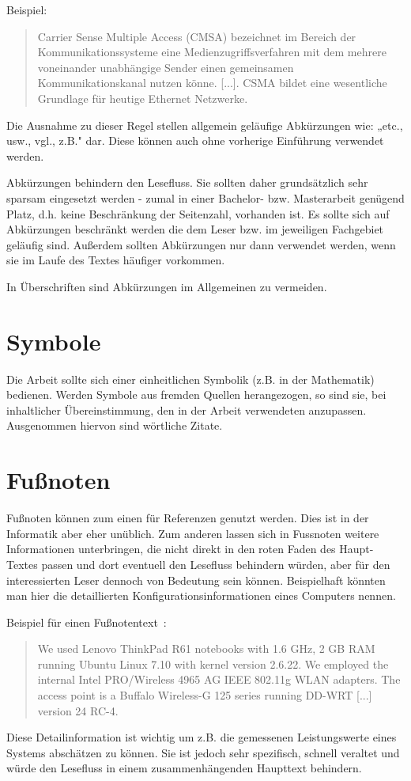 Beispiel:
%
\begin{quote}
  \glqq Carrier Sense Multiple Access (CMSA) bezeichnet im Bereich der Kommunikationssysteme eine Medienzugriffsverfahren mit dem mehrere voneinander unabhängige Sender einen gemeinsamen Kommunikationskanal nutzen könne. [...]. CSMA bildet eine wesentliche Grundlage für heutige Ethernet Netzwerke.\grqq{}~\cite{wikipedia:csma}
\end{quote}
\smallskip

Die Ausnahme zu dieser Regel stellen allgemein geläufige Abkürzungen wie: „etc., usw., vgl., z.B." dar. Diese können auch ohne vorherige Einführung verwendet werden.

Abkürzungen behindern den Lesefluss. Sie sollten daher grundsätzlich sehr sparsam eingesetzt werden - zumal in einer Bachelor- bzw. Masterarbeit genügend Platz, d.h. keine Beschränkung der Seitenzahl, vorhanden ist. Es sollte sich auf Abkürzungen beschränkt werden die dem Leser bzw. im jeweiligen Fachgebiet geläufig sind. Außerdem sollten Abkürzungen nur dann verwendet werden, wenn sie im Laufe des Textes häufiger vorkommen.

In Überschriften sind Abkürzungen im Allgemeinen zu vermeiden.

\section{Symbole}\label{sec:language:symbols}
%
Die Arbeit sollte sich einer einheitlichen Symbolik (z.B. in der Mathematik) bedienen. Werden Symbole aus fremden Quellen herangezogen, so sind sie, bei inhaltlicher Übereinstimmung, den in der Arbeit verwendeten anzupassen. Ausgenommen hiervon sind wörtliche Zitate.


\section{Fußnoten}\label{sec:language:footnotes}
%
Fußnoten können zum einen für Referenzen genutzt werden. Dies ist in der Informatik aber eher unüblich. Zum anderen lassen sich in Fussnoten weitere Informationen unterbringen, die nicht direkt in den roten Faden des Haupt-Textes passen und dort eventuell den Lesefluss behindern würden, aber für den interessierten Leser dennoch von Bedeutung sein können. Beispielhaft könnten man hier die detaillierten Konfigurationsinformationen eines Computers nennen.

Beispiel für einen Fußnotentext~\cite{bredel:2009:01}:
%
\begin{quote}
  \glqq We used Lenovo ThinkPad R61 notebooks with 1.6 GHz, 2 GB RAM running Ubuntu Linux 7.10 with kernel version 2.6.22. We employed the internal Intel PRO/Wireless 4965 AG IEEE 802.11g WLAN adapters. The access point is a Buffalo Wireless-G 125 series running DD-WRT [...] version 24 RC-4.\grqq{}
\end{quote}

Diese Detailinformation ist wichtig um z.B. die gemessenen Leistungswerte eines Systems abschätzen zu können. Sie ist jedoch sehr spezifisch, schnell veraltet und würde den Lesefluss in einem zusammenhängenden Haupttext behindern.

